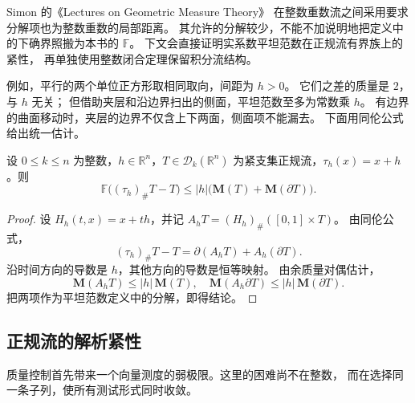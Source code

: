 Simon 的《Lectures on Geometric Measure Theory》%
\cite[\S31]{Simon1983Lectures}在整数重数流之间采用要求分解项也为整数重数的局部距离。
其允许的分解较少，不能不加说明地把定义中的下确界照搬为本书的 \(\mathbb F\)。
下文会直接证明实系数平坦范数在正规流有界族上的紧性，
再单独使用整数闭合定理保留积分流结构。

\ProseParagraphBreak

例如，平行的两个单位正方形取相同取向，间距为 \(h>0\)。
它们之差的质量是 \(2\)，与 \(h\) 无关；
但借助夹层和沿边界扫出的侧面，平坦范数至多为常数乘 \(h\)。
有边界的曲面移动时，夹层的边界不仅含上下两面，侧面项不能漏去。
下面用同伦公式给出统一估计。

\begin{proposition}\label{b1:prop:app-d-translation-flat}
设 \(0\le k\le n\) 为整数，\(h\in\mathbb R^n\)，\(T\in\mathcal D_k(\mathbb R^n)\) 为紧支集正规流，\(\tau_h(x)=x+h\)。则
\[
 \mathbb F\bigl((\tau_h)_\#T-T\bigr)
       \leq |h|\bigl(\mathbf M(T)+\mathbf M(\partial T)\bigr).
\]
\end{proposition}
\begin{proof}
设 \(H_h(t,x)=x+th\)，并记
\(A_hT=(H_h)_\#([0,1]\times T)\)。
由同伦公式，
\[
 (\tau_h)_\#T-T=\partial(A_hT)+A_h(\partial T).
\]
沿时间方向的导数是 \(h\)，其他方向的导数是恒等映射。
由余质量对偶估计，
\[
 \mathbf M(A_hT)\leq |h|\,\mathbf M(T),\quad
 \mathbf M(A_h\partial T)\leq |h|\,\mathbf M(\partial T).
\]
把两项作为平坦范数定义中的分解，即得结论。
\end{proof}

\subsection{正规流的解析紧性}
\label{b1:subsec:D10502}

质量控制首先带来一个向量测度的弱极限。这里的困难尚不在整数，
而在选择同一条子列，使所有测试形式同时收敛。

